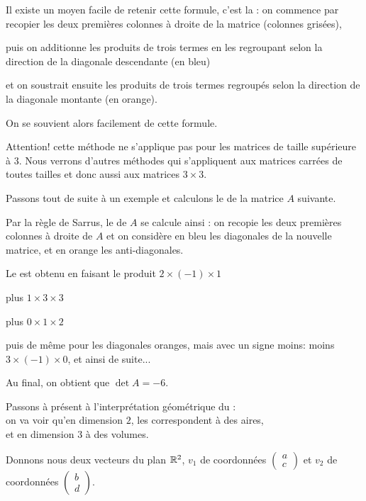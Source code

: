 \change
Il existe un moyen facile de retenir cette formule, c'est la :
on commence par recopier les deux premières colonnes à droite de la matrice (colonnes grisées), 

\change
puis on additionne les produits de trois termes en les regroupant selon la direction 
de la diagonale descendante (en bleu)

\change
et on soustrait ensuite les produits de trois termes 
regroupés selon la direction de la diagonale montante (en orange).

\change
On se souvient alors facilement de cette formule.

\change
Attention! cette méthode ne s'applique pas pour les matrices de taille supérieure à $3$. 
Nous verrons d'autres métho\-des qui s'appliquent aux matrices carrées de toutes tailles 
et donc aussi aux matrices $3\times3$.

\diapo

Passons tout de suite à un exemple et calculons le \deter de la matrice $A$ suivante.

\change
Par la règle de Sarrus, le \deter de $A$ se calcule ainsi : on recopie les deux premières colonnes à droite de $A$ 
et on considère en bleu les diagonales de la nouvelle matrice, et en orange les anti-diagonales.

\change
Le \deter est obtenu en faisant le produit $2\times (-1) \times 1$

\change
plus %
$1\times 3 \times  3$

\change
plus %
$0\times 1 \times 2$

\change
puis de même pour les diagonales oranges, mais avec un signe moins: 
moins $3\times (-1) \times 0$, et ainsi de suite...

\change
Au final, on obtient que $\det A = -6.$


\diapo

Passons à présent à l'interprétation géométrique du \deter :  \\
on va voir qu'en dimension $2$, les \deters correspondent à des aires, \\
et en dimension $3$ à des volumes.

\change
Donnons nous deux vecteurs du plan $\mathbb{R}^2$, 
$v_1$ de coordonnées $\left(\begin{smallmatrix}a \\[5pt]c\end{smallmatrix}\right)$ et 
$v_2$ de coordonnées $\left(\begin{smallmatrix}b \\[5pt] d\end{smallmatrix}\right)$.


